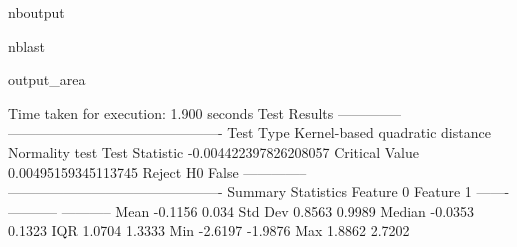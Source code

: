 \documentclass[letterpaper,10pt,english,openany,oneside]{sphinxmanual}
\begin{document}
{{{{\begin{sphinxuseclass}{nboutput}
\begin{sphinxuseclass}{nblast}
{\begin{sphinxuseclass}{output_area}
\begin{sphinxuseclass}{}
\begin{sphinxVerbatim}[commandchars=\\\{\}]
Time taken for execution: 1.900 seconds
Test Results
--------------  ----------------------------------------------
Test Type       Kernel-based quadratic distance Normality test
Test Statistic  -0.004422397826208057
Critical Value  0.00495159345113745
Reject H0       False
--------------  ----------------------------------------------
Summary Statistics
           Feature 0    Feature 1
-------  -----------  -----------
Mean         -0.1156       0.034
Std Dev       0.8563       0.9989
Median       -0.0353       0.1323
IQR           1.0704       1.3333
Min          -2.6197      -1.9876
Max           1.8862       2.7202
\end{sphinxVerbatim}



\end{sphinxuseclass}
\end{sphinxuseclass}
}

\end{sphinxuseclass}
\end{sphinxuseclass}

}}}}
\end{document}
